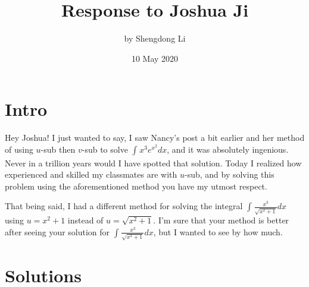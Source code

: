 \documentclass[letterpaper, 12pt]{article}
\begin{document}
\title{Response to Joshua Ji}
\author{by Shengdong Li}
\date{10 May 2020}
\maketitle

\section{Intro}
Hey Joshua! I just wanted to say, I saw Nancy's post a bit earlier and her method of using $u$-sub then $v$-sub to solve $\int_{ }^{ }x^{3}e^{x^{2}}dx$, and it was absolutely ingenious. Never in a trillion years would I have spotted that solution. Today I realized how experienced and skilled my classmates are with $u$-sub, and by solving this problem using the aforementioned method you have my utmost respect. \par
That being said, I had a different method for solving the integral $\int_{ }^{ }\frac{x^{3}}{\sqrt{x^{2}+1}}dx$ using $u=x^{2}+1$ instead of $u=\sqrt{x^{2}+1}$. I'm sure that your method is better after seeing your solution for $\int_{ }^{ }\frac{x^{3}}{\sqrt{x^{2}+1}}dx$, but I wanted to see by how much.
\section{Solutions}
\end{document}
